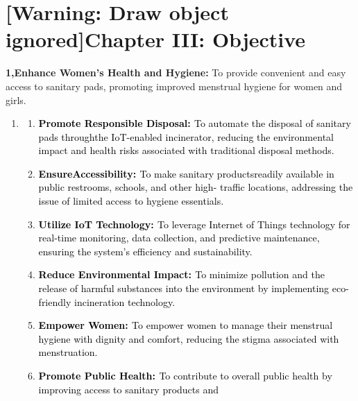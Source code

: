 \documentclass[letterpaper]{article}
\newcounter{saveenum}
\newcommand\liststyleWWNumiv{%
\renewcommand\theenumi{\arabic{enumi}}
\renewcommand\theenumii{\arabic{enumii}}
\renewcommand\labelenumi{\theenumi.}
\renewcommand\labelenumii{\theenumii.}
\renewcommand\labelitemi{{\textbullet}}
\renewcommand\labelitemii{{\textbullet}}
}
\begin{document}
\section[Chapter III: Objective]{[Warning: Draw object ignored]Chapter III: Objective}

\bigskip


\bigskip


\bigskip

\textbf{1,Enhance Women's Health and Hygiene: }To provide convenient and easy access to sanitary pads, promoting
improved menstrual hygiene for women and girls.

\liststyleWWNumiv
\setcounter{saveenum}{\value{enumi}}
\begin{enumerate}
\setcounter{enumi}{\value{saveenum}}
\item \setcounter{saveenum}{\value{enumii}}
\begin{enumerate}
\setcounter{enumii}{\value{saveenum}}
\item \textbf{\textcolor{black}{Promote Responsible Disposal: }}\textcolor{black}{To automate the disposal of sanitary
pads throughthe IoT-enabled incinerator, reducing the environmental impact and health risks associated with traditional
disposal methods.}
\item \textbf{\textcolor{black}{EnsureAccessibility: }}\textcolor{black}{To make sanitary productsreadily available in
public restrooms, schools, and other high- traffic locations, addressing the issue of limited access to hygiene
essentials.}
\item \textbf{\textcolor{black}{Utilize IoT Technology: }}\textcolor{black}{To leverage Internet of Things technology
for real-time monitoring, data collection, and predictive maintenance, ensuring the system's efficiency and
sustainability.}
\item \textbf{\textcolor{black}{Reduce Environmental Impact: }}\textcolor{black}{To minimize pollution and the release
of harmful substances into the environment by implementing eco-friendly incineration technology.}
\item \textbf{\textcolor{black}{Empower Women: }}\textcolor{black}{To empower women to manage their menstrual hygiene
with dignity and comfort, reducing the stigma associated with menstruation.}
\item \textbf{\textcolor{black}{Promote Public Health: }}\textcolor{black}{To contribute to overall public health by
improving access to sanitary products and}
\end{enumerate}
\end{enumerate}
\end{document}
